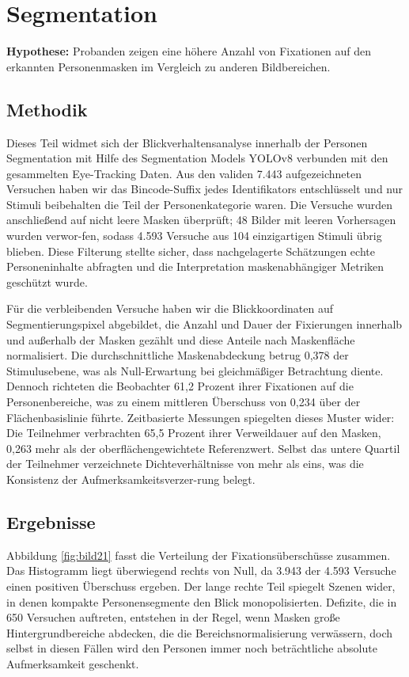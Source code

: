 \documentclass[
    language=german, %
    thesis=seminar, %
    supervisor=postdoc, %
    multiauthor=true, %
    ]{settings/csssa-thesis}
\begin{document}
\section{Segmentation}

\textbf{Hypothese:} Probanden zeigen eine höhere Anzahl von Fixationen auf den erkannten Personenmasken im Vergleich zu anderen Bildbereichen.

\subsection{Methodik}
Dieses Teil widmet sich der Blickverhaltensanalyse innerhalb der Personen Segmentation mit Hilfe des Segmentation Models 
YOLOv8 verbunden mit den gesammelten Eye-Tracking Daten. Aus den validen 7.443 aufgezeichneten Versuchen haben wir das 
Bincode-Suffix jedes Identifikators entschlüsselt und nur Stimuli beibehalten die Teil der Personenkategorie waren. 
Die Versuche wurden anschließend auf nicht leere Masken überprüft; 48 Bilder mit leeren Vorhersagen wurden verwor-fen, 
sodass 4.593 Versuche aus 104 einzigartigen Stimuli übrig blieben. Diese Filterung stellte sicher, dass nachgelagerte 
Schätzungen echte Personeninhalte abfragten und die Interpretation maskenabhängiger Metriken geschützt wurde.

Für die verbleibenden Versuche haben wir die Blickkoordinaten auf Segmentierungspixel abgebildet, die Anzahl 
und Dauer der Fixierungen innerhalb und außerhalb der Masken gezählt und diese Anteile nach Maskenfläche normalisiert. 
Die durchschnittliche Maskenabdeckung betrug 0,378 der Stimulusebene, was als Null-Erwartung bei gleichmäßiger 
Betrachtung diente. Dennoch richteten die Beobachter 61,2 Prozent ihrer Fixationen auf die Personenbereiche, 
was zu einem mittleren Überschuss von 0,234 über der Flächenbasislinie führte. Zeitbasierte Messungen spiegelten 
dieses Muster wider: Die Teilnehmer verbrachten 65,5 Prozent ihrer Verweildauer auf den Masken, 0,263 mehr als der 
oberflächengewichtete Referenzwert. Selbst das untere Quartil der Teilnehmer verzeichnete Dichteverhältnisse von 
mehr als eins, was die Konsistenz der Aufmerksamkeitsverzer-rung belegt.

\subsection{Ergebnisse}
Abbildung \ref{fig:bild21} fasst die Verteilung der Fixationsüberschüsse zusammen. Das Histogramm liegt überwiegend rechts von Null, 
da 3.943 der 4.593 Versuche einen positiven Überschuss ergeben. Der lange rechte Teil spiegelt Szenen wider, 
in denen kompakte Personensegmente den Blick monopolisierten. Defizite, die in 650 Versuchen auftreten, 
entstehen in der Regel, wenn Masken große Hintergrundbereiche abdecken, die die Bereichsnormalisierung verwässern, 
doch selbst in diesen Fällen wird den Personen immer noch beträchtliche absolute Aufmerksamkeit geschenkt.
\end{document}
